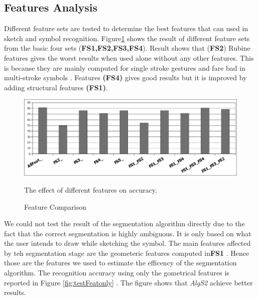 \documentclass{article}
\begin{document}
\subsection{Features Analysis}
\label{sec:featexp}
Different feature sets are tested to determine the best features that can used in sketch and symbol recognition. Figure\ref{fig:testFeaturesAll} shows the result of different feature sets from the basic four sets (\textbf{FS1,FS2,FS3,FS4}). Result shows that (\textbf{FS2}) Rubine features \cite{gestureexample12} gives the worst results when used alone without any other features. This is because they are mainly computed for single stroke gestures and fare bad in multi-stroke symbols \cite{compareFeaturSVM}. Features \textbf{(FS4)} gives good results but it is improved by adding structural features \textbf{(FS1)}.
 \begin{figure}
	\centering
		\includegraphics[scale=0.5]{images/testFeat.jpg}
	\caption{Feature Comparison} The effect of different features on accuracy.  %
	\label{fig:testFeaturesAll}
\end{figure}  
 We could not test the result of the segmentation algorithm directly due to the fact that the correct segmentation is highly ambiguous. It is only based on what the user intends to draw while sketching the symbol. 
 The main features affected by teh segmentation stage are the geometeric features computed in\textbf{FS1 }. Hence those are the features we used to estimate the efficency of the segmentation algorithm. The recognition accuracy using only the gometrical features is reported in Figure \ref{fig:testFeatonly} . The figure shows that \textsl{AlgS2} achieve better results.  %
\end{document}
